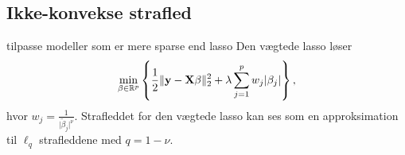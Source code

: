 \subsection{Ikke-konvekse strafled}

tilpasse modeller som er mere sparse end lasso
Den vægtede lasso løser
\begin{align*}
\min_{\beta \in \R^p} \cbr{\frac{1}{2} \Vert \y - \X \beta \Vert_2^2 + \lambda \sum_{j=1}^p w_j \vert \beta_j \vert},
\end{align*}
hvor $w_j = \frac{1}{\vert \tilde{\beta}_j \vert^\nu}$.
Strafleddet for den vægtede lasso kan ses som en approksimation til $\ell_q$ strafleddene med $q=1-\nu$.
